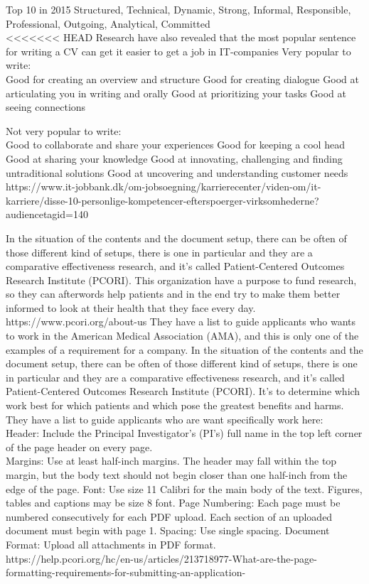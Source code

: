 Top 10 in 2015
Structured,
Technical,
Dynamic,
Strong,
Informal,
Responsible,
Professional,
Outgoing,
Analytical,
Committed \\

<<<<<<< HEAD
Research have also revealed that the most popular sentence for writing a CV can get it easier to get a job in IT-companies
Very popular to write:\\
Good for creating an overview and structure
Good for creating dialogue
Good at articulating you in writing and orally
Good at prioritizing your tasks
Good at seeing connections

Not very popular to write: \\
Good to collaborate and share your experiences
Good for keeping a cool head
Good at sharing your knowledge
Good at innovating, challenging and finding untraditional solutions
Good at uncovering and understanding customer needs
https://www.it-jobbank.dk/om-jobsoegning/karrierecenter/viden-om/it-karriere/disse-10-personlige-kompetencer-efterspoerger-virksomhederne?audiencetagid=140

In the situation of the contents and the document setup, there can be often of those different kind of setups, 
there is one in particular and they are a comparative effectiveness research, and it's called 
Patient-Centered Outcomes Research Institute (PCORI). 
This organization have a purpose to fund research, so they can afterwords help patients and in the end try to make them better
informed to look at their health that they face every day.
https://www.pcori.org/about-us
They have a list to guide applicants who wants to work in the American Medical Association (AMA),
and this is only one of the examples of a requirement for a company.
In the situation of the contents and the document setup, there can be often of those different kind of setups,
there is one in particular and they are a comparative effectiveness research, and it's called
Patient-Centered Outcomes Research Institute (PCORI).
It's to determine which work best for which patients and which pose the greatest benefits and harms. %
They have a list to guide applicants who are want specifically work here: \\

Header: Include the Principal Investigator’s (PI’s) full name in the top left corner of the page header on every page. \\
Margins: Use at least half-inch margins. The header may fall within the top margin, but the body text should not begin closer than one half-inch from the edge of the page.
Font: Use size 11 Calibri for the main body of the text. Figures, tables and captions may be size 8 font.
Page Numbering: Each page must be numbered consecutively for each PDF upload. Each section of an uploaded document must begin with page 1.
Spacing: Use single spacing.
Document Format: Upload all attachments in PDF format. \\
https://help.pcori.org/hc/en-us/articles/213718977-What-are-the-page-formatting-requirements-for-submitting-an-application-

